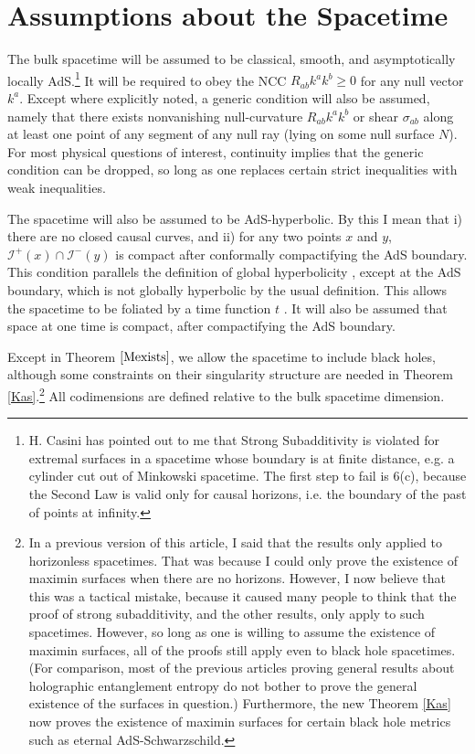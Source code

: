 \documentclass{article}
\begin{document}
\section{Assumptions about the Spacetime}

The bulk spacetime will be assumed to be classical, smooth, and asymptotically locally AdS.\footnote{H. Casini has pointed out to me that Strong Subadditivity is violated for extremal surfaces in a spacetime whose boundary is at finite distance, e.g. a cylinder cut out of Minkowski spacetime.  The first step to fail is 6(c), because the Second Law is valid only for causal horizons, i.e. the boundary of the past of points at infinity.}  It will be required to obey the NCC $R_{ab} k^a k^b \ge 0$ for any null vector $k^a$.  Except where explicitly noted, a generic condition will also be assumed, namely that there exists nonvanishing null-curvature $R_{ab} k^a k^b$ or shear $\sigma_{ab}$ along at least one point of any segment of any null ray (lying on some null surface $N$).  For most physical questions of interest, continuity implies that the generic condition can be dropped, so long as one replaces certain strict inequalities with weak inequalities.

The spacetime will also be assumed to be AdS-hyperbolic.  By this I mean that i) there are no closed causal curves, and ii) for any two points $x$ and $y$, $\mathcal{I}^+(x) \cap \mathcal{I}^-(y)$ is compact after conformally compactifying the AdS boundary.  This condition parallels the definition of global hyperbolicity \cite{BS07}, except at the AdS boundary, which is not globally hyperbolic by the usual definition.  This allows the spacetime to be foliated by a time function $t$ \cite{geroch67}.  It will also be assumed that space at one time is compact, after compactifying the AdS boundary.

Except in Theorem $\ref{Mexists}$, we allow the spacetime to include black holes, although some constraints on their singularity structure are needed in Theorem \ref{Kas}.\footnote{In a previous version of this article, I said that the results only applied to horizonless spacetimes.  That was because I could only prove the existence of maximin surfaces when there are no horizons.  However, I now believe that this was a tactical mistake, because it caused many people to think that the proof of strong subadditivity, and the other results, only apply to such spacetimes.  However, so long as one is willing to assume the existence of maximin surfaces, all of the proofs still apply even to black hole spacetimes.  (For comparison, most of the previous articles proving general results about holographic entanglement entropy do not bother to prove the general existence of the surfaces in question.)  Furthermore, the new Theorem \ref{Kas} now proves the existence of maximin surfaces for certain black hole metrics such as eternal AdS-Schwarzschild.} All codimensions are defined relative to the bulk spacetime dimension.
\end{document}
